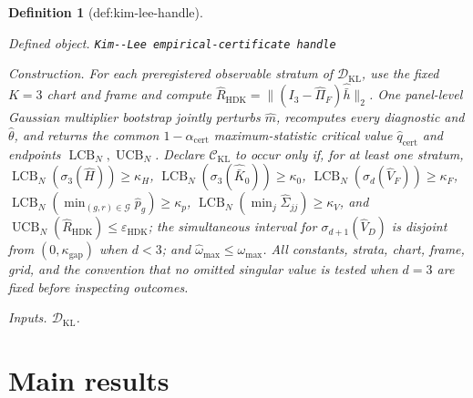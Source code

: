 \documentclass{article}
\newtheorem{definition}{Definition}
\begin{document}
\begin{definition}[def:kim-lee-handle]\label{def:kim-lee-handle}
\par\smallskip\noindent\emph{Defined object.} \texttt{Kim-\allowbreak{}-\allowbreak{}Lee empirical-\allowbreak{}certificate handle}
\par\smallskip\noindent\emph{Construction.} For each preregistered observable stratum of \(\mathscr D_{\mathrm{KL}}\), use the fixed \(K=3\) chart and frame and compute \(\widehat R_{\mathrm{HDK}}=\|(I_3-\widehat\Pi_F)\widehat{\bar h}\|_2\). One panel-level Gaussian multiplier bootstrap jointly perturbs \(\widehat m\), recomputes every diagnostic and \(\widehat\theta\), and returns the common \(1-\alpha_{\mathrm{cert}}\) maximum-statistic critical value \(\widehat q_{\mathrm{cert}}\) and endpoints \(\operatorname{LCB}_N,\operatorname{UCB}_N\). Declare \(\mathcal C_{\mathrm{KL}}\) to occur only if, for at least one stratum, \(\operatorname{LCB}_N(\sigma_3(\widehat H))\ge\kappa_H\), \(\operatorname{LCB}_N(\sigma_3(\widehat{\bar K}_0))\ge\kappa_0\), \(\operatorname{LCB}_N(\sigma_d(\widehat V_F))\ge\kappa_F\), \(\operatorname{LCB}_N(\min_{(g,r)\in\mathcal G}\widehat p_g)\ge\kappa_p\), \(\operatorname{LCB}_N(\min_j\widehat\Sigma_{jj})\ge\kappa_V\), and \(\operatorname{UCB}_N(\widehat R_{\mathrm{HDK}})\le\varepsilon_{\mathrm{HDK}}\); the simultaneous interval for \(\sigma_{d+1}(\widehat V_D)\) is disjoint from \((0,\kappa_{\mathrm{gap}})\) when \(d<3\); and \(\widehat\omega_{\max}\le\omega_{\max}\). All constants, strata, chart, frame, grid, and the convention that no omitted singular value is tested when \(d=3\) are fixed before inspecting outcomes.
\par\smallskip\noindent\emph{Inputs.} \(\mathscr D_{\mathrm{KL}}\).
\end{definition}

\section{Main results}
\end{document}
